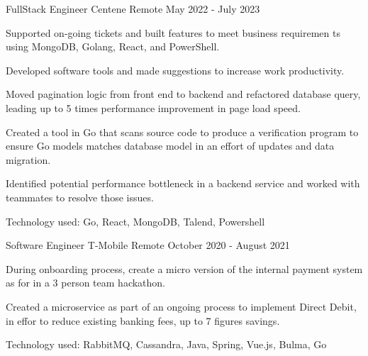 


\begin{cventries}


\cventry
{FullStack Engineer}
{Centene}
{Remote}
{May 2022 - July 2023}
{
\begin{cvitems}
\item {Supported on-going tickets and built features to meet business requiremen          ts using MongoDB, Golang, React, and PowerShell.}
\item {Developed software tools and made suggestions to increase work productivity.}
\item {Moved pagination logic from front end to backend and refactored database query, leading up to 5 times performance improvement in page load speed.}
\item {Created a tool in Go that scans source code to produce a verification program to ensure Go models matches database model in an effort of updates and data migration.}
\item {Identified potential performance bottleneck in a backend service and worked with teammates to resolve those issues.}
\item {Technology used: Go, React, MongoDB, Talend, Powershell}
\end{cvitems}
}

\cventry
{Software Engineer}
{T-Mobile}
{Remote}
{October 2020 - August 2021}
{
\begin{cvitems}
\item {During onboarding process, create a micro version of the internal payment system as for in a 3 person team hackathon.}
\item {Created a microservice as part of an ongoing process to implement Direct Debit, in effor to reduce existing banking fees, up to 7 figures savings.}
\item {Technology used: RabbitMQ, Cassandra, Java, Spring, Vue.js, Bulma, Go}
\end{cvitems}
}


\end{cventries}
